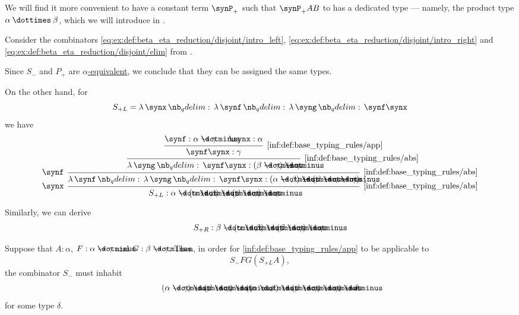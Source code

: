 \begin{example}
\begin{thmenum}
    We will find it more convenient to have a constant term \( \synP_+ \) such that \( \synP_+ A B \) to has a dedicated type --- namely, the product type \( \alpha \syntimes \beta \), which we will introduce in .

     Consider the combinators \ref{eq:ex:def:beta_eta_reduction/disjoint/intro_left}, \ref{eq:ex:def:beta_eta_reduction/disjoint/intro_right} and \ref{eq:ex:def:beta_eta_reduction/disjoint/elim} from .

    Since \( S_- \) and \( P_+ \) are \hyperref[def:lambda_term_alpha_equivalence]{\( \alpha \)-equivalent}, we conclude that they can be assigned the same types.

    On the other hand, for
    \begin{equation*}
      S_{+L} = \qabs \synx \qabs \synf \qabs \syng \synf \synx
    \end{equation*}
    we have
    \begin{equation*}
      \begin{prooftree}
        \hypo{ \synf: \alpha \synimplies \gamma }
        \hypo{ \synx: \alpha }
        \infer2[\ref{inf:def:base_typing_rules/app}]{ \synf \synx: \gamma }
        \infer1[\ref{inf:def:base_typing_rules/abs}]{ \qabs \syng \synf \synx: (\beta \synimplies \gamma) \synimplies \gamma }
        \infer[left label=\( \synf \)]1[\ref{inf:def:base_typing_rules/abs}]{ \qabs \synf \qabs \syng \synf \synx: (\alpha \synimplies \beta) \synimplies (\beta \synimplies \gamma \synimplies \gamma) }
        \infer[left label=\( \synx \)]1[\ref{inf:def:base_typing_rules/abs}]{ S_{+L}: \alpha \synimplies (\alpha \synimplies \beta) \synimplies (\beta \synimplies \gamma) \synimplies \gamma }
      \end{prooftree}
    \end{equation*}

    Similarly, we can derive
    \begin{equation*}
      S_{+R}: \beta \synimplies (\alpha \synimplies \beta) \synimplies (\beta \synimplies \gamma) \synimplies \gamma.
    \end{equation*}

    Suppose that \( A: \alpha \), \( F: \alpha \synimplies \gamma \) and \( G: \beta \synimplies \gamma \). Then, in order for \ref{inf:def:base_typing_rules/app} to be applicable to
    \begin{equation*}
      S_- F G (S_{+L} A),
    \end{equation*}
    the combinator \( S_- \) must inhabit
    \begin{equation*}
      (\alpha \synimplies \gamma) \synimplies (\beta \synimplies \gamma) \synimplies ((\alpha \synimplies \beta) \synimplies (\beta \synimplies \gamma) \synimplies \gamma) \synimplies \delta
    \end{equation*}
    for some type \( \delta \).


\end{thmenum}
\end{example}
